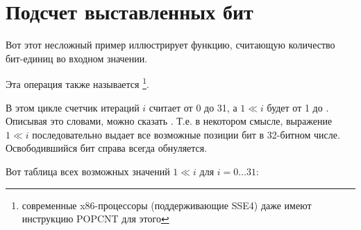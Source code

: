 ﻿\section{Подсчет выставленных бит}

Вот этот несложный пример иллюстрирует функцию, считающую количество бит-единиц во входном значении.

Эта операция также называется \footnote{современные x86-процессоры (поддерживающие SSE4) даже имеют инструкцию POPCNT для этого}.



В этом цикле счетчик итераций $i$ считает от 0 до 31, а $1 \ll i$ будет от 1 до . 
Описывая это словами, можно сказать 
.
Т.е. в некотором смысле, выражение $1 \ll i$ последовательно выдает все возможные позиции бит в 32-битном числе. 
Освободившийся бит справа всегда обнуляется.

Вот таблица всех возможных значений $1 \ll i$ для $i=0 \ldots 31$:


